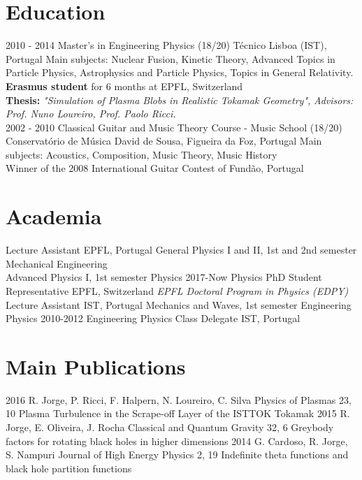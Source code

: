 \documentclass[]{friggeri-cv}
\begin{document}
\section{Education}
\begin{entrylist}
  \entry
    {2010 - 2014}
    {Master's in Engineering Physics (18/20)}
    {Técnico Lisboa (IST), Portugal}
    {Main subjects: Nuclear Fusion, Kinetic Theory, Advanced Topics in Particle Physics, Astrophysics and Particle Physics, Topics in General Relativity.\\
    \textbf{Erasmus student} for 6 months at EPFL, Switzerland\\
    \textbf{Thesis:} \emph{"Simulation of Plasma Blobs in Realistic Tokamak Geometry",}
    \emph{Advisors: Prof. Nuno Loureiro, Prof. Paolo Ricci.}\\}
    \entry
    {2002 - 2010}
    {Classical Guitar and Music Theory Course - Music School (18/20)\hspace{1cm}}
    {Conservatório de Música David de Sousa, Figueira da Foz, Portugal}
    {Main subjects: Acoustics, Composition, Music Theory, Music History
    \\
    Winner of the 2008 International Guitar Contest of Fundão, Portugal}
\end{entrylist}

\section{Academia}
\begin{entrylist}
    {Lecture Assistant}
    {EPFL, Portugal}
    {General Physics I and II, 1st and 2nd semester Mechanical Engineering
    \\
    Advanced Physics I, 1st semester Physics}
  \entry
    {2017-Now}
    {Physics PhD Student Representative}
    {EPFL, Switzerland}
    {\emph{EPFL Doctoral Program in Physics (EDPY)}}
    {Lecture Assistant}
    {IST, Portugal}
    {Mechanics and Waves, 1st semester Engineering Physics}
  \entry
    {2010-2012}
    {Engineering Physics Class Delegate}
    {IST, Portugal}
    {\emph{}}
\end{entrylist}

\section{Main Publications}
\begin{entrylist}
  \entry
    {2016}
    {R. Jorge, P. Ricci, F. Halpern, N. Loureiro, C. Silva}
    {Physics of Plasmas 23, 10}
    {Plasma Turbulence in the Scrape-off Layer of the ISTTOK Tokamak}
  \entry
    {2015}
    {R. Jorge, E. Oliveira, J. Rocha}
    {Classical and Quantum Gravity 32, 6}
    {Greybody factors for rotating black holes in higher dimensions}
  \entry
    {2014}
    {G. Cardoso, R. Jorge, S. Nampuri}
    {Journal of High Energy Physics 2, 19}
    {Indefinite theta functions and black hole partition functions}
\end{entrylist}
\end{document}
